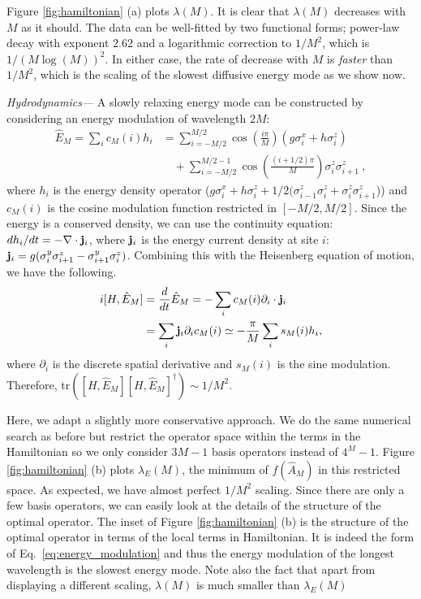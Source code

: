 \documentclass[twocolumn,superscriptaddress, prb]{revtex4-1}
\begin{document}
Figure \ref{fig:hamiltonian} (a) plots $\lambda (M)$.  %
It is clear that $\lambda(M)$ decreases with $M$ as it should.
The data can be well-fitted by two functional forms; power-law decay with exponent $2.62$ and a logarithmic correction to $1/M^2$, which is $1/(M\log(M))^2$.
In either case, the rate of decrease with $M$ is {\it faster} than $1/M^2$, which is the scaling of the slowest diffusive energy mode as we show now.

{\it Hydrodynamics---}
A slowly relaxing energy mode can be constructed by considering an energy modulation of wavelength $2M$:
\begin{align}
\hat{E}_M = \sum_i c_M(i) h_i
&= \sum_{i=-M/2}^{M/2} \cos\left(\frac{i\pi}{M}\right)(g \sigma^x_i + h\sigma^z_i)\nonumber\\
&\quad+ \sum_{i=-M/2}^{M/2-1} \cos\left(\frac{(i+1/2)\pi}{M}\right)\sigma^z_i\sigma^z_{i+1} ~,
\label{eq:energy_modulation}
\end{align}
where $h_i$ is the energy density operator ($g \sigma^x_i + h\sigma^z_i + 1/2(\sigma^z_{i-1}\sigma^z_i + \sigma^z_i\sigma^z_{i+1}$))
and $c_M(i)$ is the cosine modulation function restricted in $[-M/2,M/2]$.
Since the energy is a conserved density, we can use the continuity equation:
$d h_i/dt = -\nabla \cdot {\bf j}_i$, where ${\bf j}_i$ is the energy current density at site $i$:
${\bf j}_i = g(\sigma^y_i \sigma^z_{i+1} - \sigma^y_{i+1} \sigma^z_i)$.
Combining this with the Heisenberg equation of motion, we have the following.
\begin{align}
 i[H,\hat{E}_M] &= \frac{d}{dt} \hat{E}_M = -\sum_i c_M(i) \partial_i \cdot {\bf j}_i \\
 &= \sum_i {\bf j}_i \partial_i c_M(i) \simeq -\frac{\pi}{M} \sum_i s_M(i) h_i,
\end{align}
where $\partial_i$ is the discrete spatial derivative and $s_M(i)$ is the sine modulation.
Therefore, $\mathrm{tr}([H,\hat{E}_M][H,\hat{E}_M]^\dag) \sim 1/M^2$.

Here, we adapt a slightly more conservative approach.
We do the same numerical search as before but restrict the operator space within the terms in the Hamiltonian
so we only consider $3M-1$ basis operators instead of $4^M-1$.
Figure \ref{fig:hamiltonian} (b) plots $\lambda_E(M)$, the minimum of $f(\hat{A}_M)$ in this restricted space.
As expected, we have almost perfect $1/M^2$ scaling.
Since there are only a few basis operators, we can easily look at the details of the structure of the optimal operator.
The inset of Figure \ref{fig:hamiltonian} (b) is the structure of the optimal operator in terms of the local terms in Hamiltonian.
It is indeed the form of Eq.~\eqref{eq:energy_modulation} and thus the energy modulation of the longest wavelength is the slowest energy mode.
Note also the fact that apart from displaying a different scaling, $\lambda(M)$ is much smaller than $\lambda_E(M)$
\end{document}
